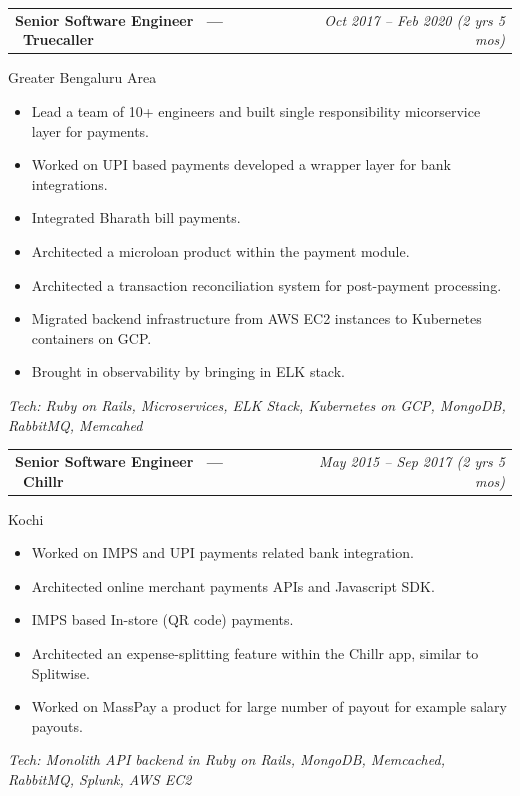 \documentclass[10.5pt,a4paper]{article}
\makeatletter
\newcommand{\jobheader}[3]{%
  \noindent
  \begin{tabular*}{\textwidth}{@{\extracolsep{\fill}}l r}
    \textbf{\large #1} & {\itshape\color{lightgray} #3} \\
  \end{tabular*}\par
}
\newcommand{\jobentry}[4]{%
  \jobheader{#1 \ --- \ \textbf{#2}}{}{#3}
  {\color{graytext} #4}\par\vspace{2pt}
}
\newcommand{\techline}[1]{%
  {\small\itshape\color{blue} Tech: #1}\par\vspace{6pt}
}
\makeatother
\begin{document}
\jobentry{Senior Software Engineer}{Truecaller}{Oct 2017 -- Feb 2020 (2 yrs 5 mos)}{Greater Bengaluru Area}
\begin{itemize}[leftmargin=16pt, itemsep=1pt, topsep=2pt, parsep=0pt]
  \item Lead a team of 10+ engineers and built single responsibility micorservice layer for payments.
  \item Worked on UPI based payments developed a wrapper layer for bank integrations.
  \item Integrated Bharath bill payments.
  \item Architected a microloan product within the payment module.
  \item Architected a transaction reconciliation system for post-payment processing.
  \item Migrated backend infrastructure from AWS EC2 instances to Kubernetes containers on GCP.
  \item Brought in observability by bringing in ELK stack.
\end{itemize}
\techline{Ruby on Rails, Microservices, ELK Stack, Kubernetes on GCP, MongoDB, RabbitMQ, Memcahed}

\jobentry{Senior Software Engineer}{Chillr}{May 2015 -- Sep 2017 (2 yrs 5 mos)}{Kochi}
\begin{itemize}[leftmargin=16pt, itemsep=1pt, topsep=2pt, parsep=0pt]
  \item Worked on IMPS and UPI payments related bank integration.
  \item Architected online merchant payments APIs and Javascript SDK.
  \item IMPS based In-store (QR code) payments.
  \item Architected an expense-splitting feature within the Chillr app, similar to Splitwise.
  \item Worked on MassPay a product for large number of payout for example salary payouts.
\end{itemize}
\techline{Monolith API backend in Ruby on Rails, MongoDB, Memcached, RabbitMQ, Splunk, AWS EC2}
\end{document}
